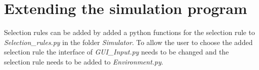 \documentclass[twoside,openright]{uva-bachelor-thesis}
\begin{document}
\section{Extending the simulation program}
Selection rules can be added by added a python functions for the selection rule to \textit{Selection\_rules.py} in the folder \textit{Simulator}. To allow the user to choose the added selection rule the interface of \textit{GUI\_Input.py} needs to be changed and the selection rule needs to be added to \textit{Environment.py}.
\end{document}
